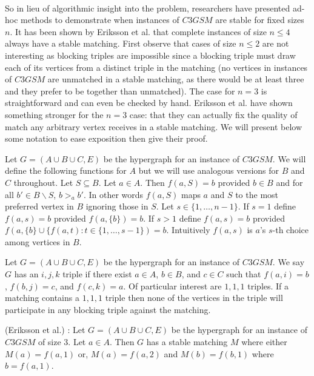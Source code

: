 \begin{definition}
\paragraph{}
So in lieu of algorithmic insight into the problem, researchers have presented ad-hoc methods to demonstrate when instances of $C3GSM$ are stable for fixed sizes $n$. It has been shown by Eriksson et al. \cite{eriksson2006three} that complete instances of size $n \leq 4$ always have a stable matching. First observe that cases of size $n \leq 2$ are not interesting as blocking triples are impossible since a blocking triple must draw each of its vertices from a distinct triple in the matching (no vertices in instances of $C3GSM$ are unmatched in a stable matching, as there would be at least three and they prefer to be together than unmatched). The case for $n=3$ is straightforward and can even be checked by hand. Eriksson et al. have shown something stronger for the $n=3$ case: that they can actually fix the quality of match any arbitrary vertex receives in a stable matching. We will present below some notation to ease exposition then give their proof.
\begin{definition}
Let $G=(A\cup B \cup C, E)$ be the hypergraph for an instance of $C3GSM$. We will define the following functions for $A$ but we will use analogous versions for $B$ and $C$ throughout. Let $S\subseteq B$. Let $a \in A$. Then $f(a, S) = b$ provided $b \in B$ and for all $b' \in B \backslash S$, $b>_a b'$. In other words $f(a,S)$ maps $a$ and $S$ to the most preferred vertex in $B$ ignoring those in $S$. Let $s \in \{1,\dots,n-1\}$. If $s=1$ define $f(a,s) = b$ provided $f(a,\{b\}) = b$. If $s>1$ define $f(a,s) = b$ provided $f(a,\{b\}\cup\{f(a,t): t\in\{1,\dots,s-1\}) = b$. Intuitively $f(a,s)$ is $a$'s $s$-th choice among vertices in $B$.
\end{definition}
\begin{definition}
Let $G = (A \cup B \cup C, E)$ be the hypergraph for an instance of $C3GSM$. We say $G$ has an $i,j,k$ triple if there exist $a \in A$, $b\in B$, and $c \in C$ such that $f(a,i) = b$, $f(b,j) = c$, and $f(c,k) = a$. Of particular interest are $1,1,1$ triples. If a matching contains a $1,1,1$ triple then none of the vertices in the triple will participate in any blocking triple against the matching.
\end{definition}
\begin{lemma}\label{lemma:n3}
(Eriksson et al.) \cite{eriksson2006three}: Let $G=(A\cup B \cup C, E)$ be the hypergraph for an instance of $C3GSM$ of size $3$. Let $a \in A$. Then $G$ has a stable matching $M$ where either $M(a)= f(a,1)$ or, $M(a) = f(a,2)$ and $M(b) = f(b,1)$ where $b = f(a,1)$.

\end{lemma}
\end{definition}
